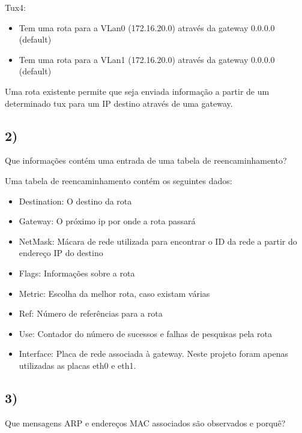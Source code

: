 \documentclass[11pt]{article}
\begin{document}
Tux4:
\begin{itemize}
\item Tem uma rota para a VLan0 (172.16.20.0) através da gateway 0.0.0.0 (default)
\item Tem uma rota para a VLan1 (172.16.20.0) através da gateway 0.0.0.0 (default)
	
\end{itemize}

Uma rota existente permite que seja enviada informação a partir de um determinado tux para um IP destino através de uma gateway.


\subsection{2)} Que informações contém uma entrada de uma tabela de reencaminhamento?

Uma tabela de reencaminhamento contém os seguintes dados:

\begin{itemize}

\item Destination: O destino da rota

\item Gateway: O próximo ip por onde a rota passará

\item NetMask: Mácara de rede utilizada para encontrar o ID da rede a partir do endereço IP do destino

\item Flags: Informações sobre a rota

\item Metric: Escolha da melhor rota, caso existam várias

\item Ref: Número de referências para a rota

\item Use: Contador do número de sucessos e falhas de pesquisas pela rota

\item Interface: Placa de rede associada à gateway. Neste projeto foram apenas utilizadas as placas eth0 e eth1.

\end{itemize}

\subsection{3)} Que mensagens ARP e endereços MAC associados são observados e porquê?
\end{document}
